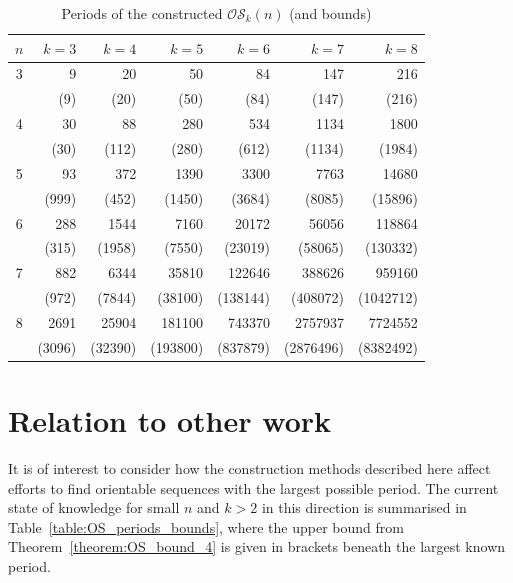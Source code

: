 \documentclass[a4paper,11pt]{article}
\begin{document}
\begin{table}[htb]
\centering \caption{Periods of the constructed $\mathcal{OS}_k(n)$ (and bounds)}
\label{table:OS_antineg_periods_bounds}

\begin{tabular}{c|rrrrrr} \hline
$n$ & $k=3$   & $k=4$    & $k=5$    & $k=6$    & $k=7$     & $k=8$     \\ \hline
3   & 9       & 20       & 50       & 84       & 147       & 216       \\
    & (9)     & (20)     & (50)     & (84)     & (147)     & (216)     \\ \hline
4   & 30      & 88       & 280      & 534      & 1134      & 1800      \\
    & (30)    & (112)    & (280)    & (612)    & (1134)    & (1984)    \\ \hline
5   & 93      & 372      & 1390     & 3300     & 7763      & 14680     \\
    & (999)   & (452)    & (1450)   & (3684)   & (8085)    & (15896)   \\ \hline
6   & 288     & 1544     & 7160     & 20172    & 56056     & 118864    \\
    & (315)   & (1958)   & (7550)   & (23019)  & (58065)   & (130332)  \\ \hline
7   & 882     & 6344     & 35810    & 122646   & 388626    & 959160    \\
    & (972)   & (7844)   & (38100)  & (138144) & (408072)  & (1042712) \\ \hline
8   & 2691    & 25904    & 181100   & 743370   & 2757937   & 7724552   \\
    & (3096)  & (32390)  & (193800) & (837879) & (2876496) & (8382492) \\ \hline
\end{tabular}

\end{table}



\section{Relation to other work}  \label{section:other_work}



It is of interest to consider how the construction methods described here affect efforts to find
orientable sequences with the largest possible period.  The current state of knowledge for small
$n$ and $k>2$ in this direction is summarised in Table~\ref{table:OS_periods_bounds}, where the
upper bound from Theorem~\ref{theorem:OS_bound_4} is given in brackets beneath the largest known
period.
\end{document}
